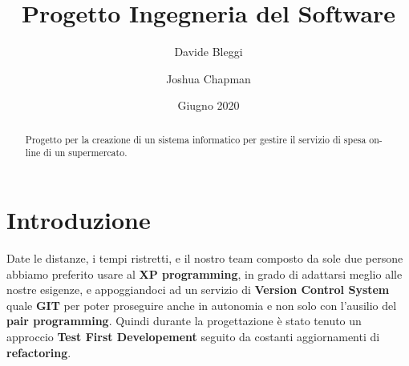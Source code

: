 \documentclass[12pt, a4paper]{article}
\title{Progetto Ingegneria del Software}
\author{Davide Bleggi \and Joshua Chapman}
\date{Giugno 2020}
\numberwithin{equation}{section} %
\begin{document}
\begin{titlepage}
  \maketitle
\end{titlepage}

\begin{abstract}
  Progetto per la creazione di un sistema informatico per gestire il servizio 
  di spesa on-line di un supermercato.
\end{abstract}


\tableofcontents
\newpage


\section{Introduzione}
Date le distanze, i tempi ristretti, e il nostro team composto da sole due persone abbiamo preferito usare al \textbf{XP programming}, in grado di adattarsi meglio alle nostre esigenze, e appoggiandoci ad un servizio di \textbf{Version Control System} quale \textbf{GIT} per poter proseguire anche in autonomia e non solo con l'ausilio del \textbf{pair programming}. Quindi durante la progettazione è stato tenuto un approccio \textbf{Test First Developement} seguito da costanti aggiornamenti di \textbf{refactoring}.
\end{document}
